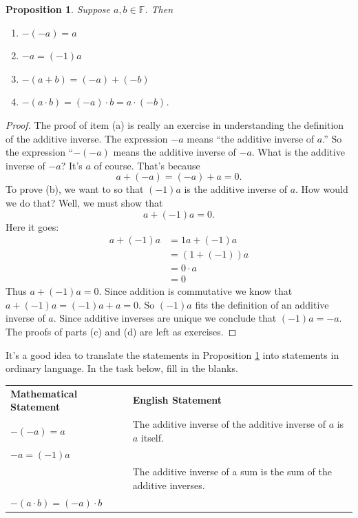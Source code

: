 \documentclass[11pt]{article}
\newenvironment{task}
	{\begin{mdframed}[linecolor=lightgray, linewidth=3pt]\raggedright}
	{\end{mdframed}}
\newtheorem{proposition}[theorem]{Proposition}
\theoremstyle{definition}
\begin{document}
\begin{proposition}
  Suppose $a,b\in\mathbb{F}$. Then
  \begin{enumerate}
    \item[(a)] $-(-a) = a$
    \item[(b)] $-a = (-1)a$
    \item[(c)] $-(a+b)=(-a) + (-b)$
    \item[(d)] $-(a\cdot b) = (-a)\cdot b = a\cdot (-b)$.
  \end{enumerate}\label{prop: additive inverses}
\end{proposition}
\begin{proof}
The proof of item (a) is really an exercise in understanding the definition of the additive inverse. The expression $-a$ means ``the additive inverse
of $a$.'' So the expression ``$-(-a)$ means the additive inverse of $-a$. What is the additive inverse of $-a$? It's $a$ of course. That's because
\[ a + (-a) = (-a) + a = 0.\]
To prove (b), we want to so that $(-1)a$ is the additive inverse of $a$. How would we do that? Well, we must show that
\[ a + (-1)a = 0.\]
Here it goes:
\begin{align*}
  a + (-1)a &= 1a + (-1)a\\
            &= (1 + (-1))a\\
            &= 0\cdot a\\
            &= 0
\end{align*}
Thus $a+(-1)a =0$. Since addition is commutative we know that $a+(-1)a=(-1)a+a=0$. So $(-1)a$ fits the definition of an additive inverse of $a$. Since 
additive inverses are unique we conclude that $(-1)a=-a$. The proofs of parts (c) and (d) are left as exercises.
\end{proof}

It's a good idea to translate the statements in Proposition \ref{prop: additive inverses} into statements in ordinary language. In the task below, fill in the blanks.

\begin{task}
\begin{center}
  \begin{tabular}[]{ll}
    \textbf{Mathematical Statement} & \textbf{English Statement} \\
   $-(-a)=a$ & The additive inverse of the additive inverse of $a$ is $a$ itself.\\
   $-a = (-1)a$ & \underline{\hspace{4in}}\\ %
   \underline{\hspace{1in}} & The additive inverse of a sum is the sum of the additive inverses.\\
   $-(a\cdot b) = (-a)\cdot b$  & \underline{\hspace{4in}}%
  \end{tabular}
\end{center}
\end{task}
\end{document}
